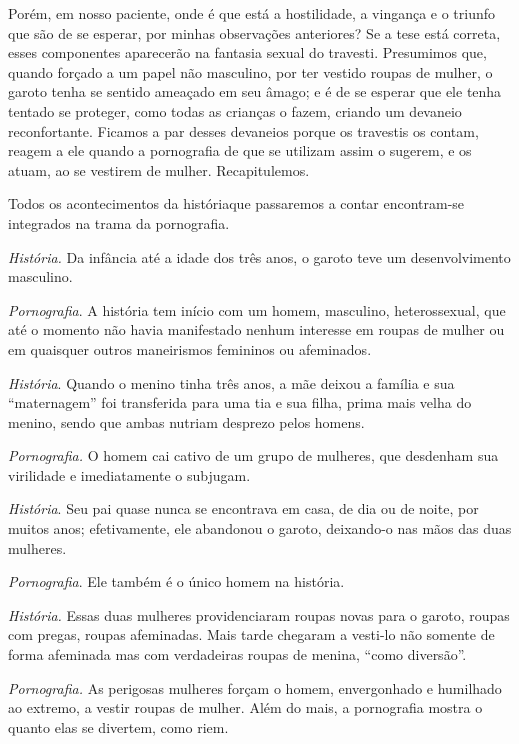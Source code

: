 Porém, em nosso paciente, onde é que está a hostilidade,\idxvinga{} a vingança\idxpervmotiv{}
e o triunfo que são de se esperar, por minhas observações anteriores?
Se a tese está correta, esses componentes aparecerão na fantasia sexual
do travesti. Presumimos que, quando forçado a um papel não masculino,
por ter vestido roupas de mulher, o garoto tenha se sentido ameaçado em
seu âmago; e é de se esperar que ele tenha tentado se proteger, como
todas as crianças o fazem, criando um devaneio reconfortante. Ficamos a
par desses devaneios porque os travestis os contam, reagem a ele quando
a pornografia\idxpornofant{} de que se utilizam assim o sugerem, e os atuam, ao se
vestirem de mulher. Recapitulemos.

Todos os acontecimentos da história\idxpornoreal[|(] que passaremos a contar
encontram-se integrados na trama da pornografia.




\textit{História.} Da infância até a idade dos três anos, o garoto
teve um desenvolvimento masculino.

\textit{Pornografia}. A história tem início com um homem, masculino,
heterossexual, que até o momento não havia manifestado nenhum interesse
em roupas de mulher ou em quaisquer outros maneirismos femininos ou
afeminados.




\textit{História}. Quando o menino tinha três anos, a mãe deixou a
família e sua ``maternagem'' foi transferida
para uma tia e sua filha, prima mais velha do menino, sendo que ambas
nutriam desprezo pelos homens.

\textit{Pornografia.} O homem cai cativo de um grupo de mulheres,
que desdenham sua virilidade e imediatamente o subjugam.




\textit{História}. Seu pai quase nunca se encontrava em casa, de dia
ou de noite, por muitos anos; efetivamente, ele abandonou o garoto,
deixando-o nas mãos das duas mulheres.

\textit{Pornografia}. Ele também é o único homem na história.




\textit{História.} Essas duas mulheres providenciaram roupas novas
para o garoto, roupas com pregas, roupas afeminadas. Mais tarde
chegaram a vesti-lo não somente de forma afeminada mas com verdadeiras
roupas de menina, ``como diversão''.

\textit{Pornografia.} As perigosas mulheres forçam o homem,
envergonhado e humilhado ao extremo, a vestir roupas de mulher. Além do
mais, a pornografia mostra o quanto elas se divertem, como riem.




